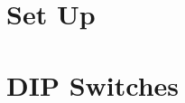 \documentclass[oneside]{book}
\begin{document}
\section{Set Up}

\section{DIP Switches}


















\end{document}
